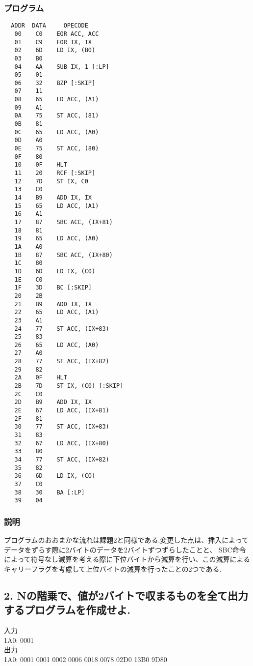 \documentclass[titlepage]{jsarticle}
\theoremstyle{definition}
\begin{document}
\subsubsection{プログラム}

\begin{lstlisting}
  ADDR  DATA     OPECODE
   00    C0    EOR ACC, ACC
   01    C9    EOR IX, IX
   02    6D    LD IX, (B0)
   03    B0
   04    AA    SUB IX, 1 [:LP]
   05    01
   06    32    BZP [:SKIP]
   07    11
   08    65    LD ACC, (A1)
   09    A1
   0A    75    ST ACC, (81)
   0B    81
   0C    65    LD ACC, (A0)
   0D    A0
   0E    75    ST ACC, (80)
   0F    80
   10    0F    HLT
   11    20    RCF [:SKIP]
   12    7D    ST IX, C0
   13    C0
   14    B9    ADD IX, IX
   15    65    LD ACC, (A1)
   16    A1
   17    87    SBC ACC, (IX+81)
   18    81
   19    65    LD ACC, (A0)
   1A    A0
   1B    87    SBC ACC, (IX+80)
   1C    80
   1D    6D    LD IX, (C0)
   1E    C0
   1F    3D    BC [:SKIP]
   20    2B
   21    B9    ADD IX, IX
   22    65    LD ACC, (A1)
   23    A1
   24    77    ST ACC, (IX+83)
   25    83
   26    65    LD ACC, (A0)
   27    A0
   28    77    ST ACC, (IX+82)
   29    82
   2A    0F    HLT
   2B    7D    ST IX, (C0) [:SKIP]
   2C    C0
   2D    B9    ADD IX, IX
   2E    67    LD ACC, (IX+81)
   2F    81
   30    77    ST ACC, (IX+83)
   31    83
   32    67    LD ACC, (IX+80)
   33    80
   34    77    ST ACC, (IX+82)
   35    82
   36    6D    LD IX, (CO)
   37    C0
   38    30    BA [:LP]
   39    04

\end{lstlisting}

\subsubsection{説明}
プログラムのおおまかな流れは課題2と同様である.変更した点は、挿入によってデータをずらす際に2バイトのデータを2バイトずつずらしたことと、
SBC命令によって符号なし減算を考える際に下位バイトから減算を行い、この減算によるキャリーフラグを考慮して上位バイトの減算を行ったことの2つである.

\subsection*{2. Nの階乗で、値が2バイトで収まるものを全て出力するプログラムを作成せよ.}
入力 \\
1A0: 0001 \\

出力 \\
1A0: 0001 0001 0002 0006 0018 0078 02D0 13B0 9D80 \\
\end{document}
